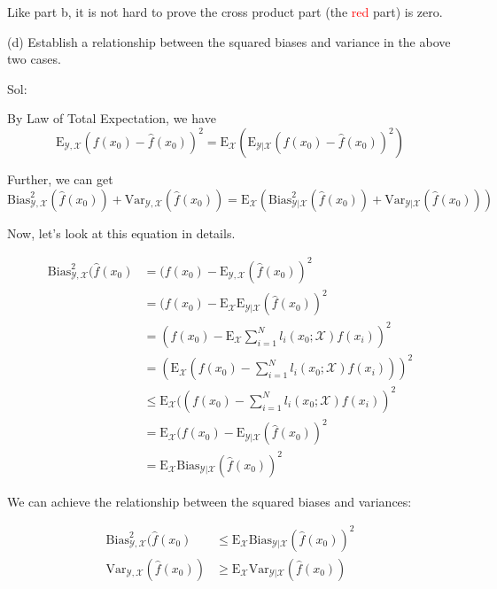 \documentclass[english]{article}\usepackage[]{graphicx}\usepackage[]{color}
\begin{document}
Like part b, it is not hard to prove the cross product part (the \textcolor{red}{red}
part) is zero.

\vspace{0.5cm}

(d) Establish a relationship between the squared biases and variance
in the above two cases.

\vspace{0.5cm}

Sol:

By Law of Total Expectation, we have 
\[
\mathrm{E}_{\mathcal{Y},\mathcal{X}}(f(x_{0})-\hat{f}(x_{0}))^{2}=\mathrm{E}_{\mathcal{X}}(\mathrm{E}_{\mathcal{Y}|\mathcal{X}}(f(x_{0})-\hat{f}(x_{0}))^{2})
\]

Further, we can get 
\[
\mathrm{Bias}_{\mathcal{Y},\mathcal{X}}^{2}(\hat{f}(x_{0}))+\mathrm{Var}_{\mathcal{Y},\mathcal{X}}(\hat{f}(x_{0}))=\mathrm{E}_{\mathcal{X}}(\mathrm{Bias}_{\mathcal{Y}|\mathcal{X}}^{2}(\hat{f}(x_{0}))+\mathrm{Var}_{\mathcal{Y}|\mathcal{X}}(\hat{f}(x_{0})))
\]

Now, let's look at this equation in details.

\begin{align*}
\mathrm{Bias}_{\mathcal{Y},\mathcal{X}}^{2}(\hat{f}(x_{0}) & =(f(x_{0})-\mathrm{E}_{\mathcal{Y},\mathcal{X}}(\hat{f}(x_{0}))^{2}\\
 & =(f(x_{0})-\mathrm{E_{\mathcal{X}}}\mathrm{E}_{\mathcal{Y}|\mathcal{X}}(\hat{f}(x_{0}))^{2}\\
 & =(f(x_{0})-\mathrm{E}_{\mathcal{X}}\sum_{i=1}^{N}l_{i}(x_{0};\mathcal{X})f(x_{i}))^{2}\\
 & =(\mathrm{E}_{\mathcal{X}}(f(x_{0})-\sum_{i=1}^{N}l_{i}(x_{0};\mathcal{X})f(x_{i})))^{2}\\
 & \leq\mathrm{E}_{\mathcal{X}}((f(x_{0})-\sum_{i=1}^{N}l_{i}(x_{0};\mathcal{X})f(x_{i}))^{2}\\
 & =\mathrm{E}_{\mathcal{X}}(f(x_{0})-\mathrm{E}_{\mathcal{Y}|\mathcal{X}}(\hat{f}(x_{0}))^{2}\\
 & =\mathrm{E}_{\mathcal{X}}\mathrm{Bias}_{\mathcal{Y}|\mathcal{X}}(\hat{f}(x_{0}))^{2}
\end{align*}

We can achieve the relationship between the squared biases and variances:

\begin{align*}
\mathrm{Bias}_{\mathcal{Y},\mathcal{X}}^{2}(\hat{f}(x_{0}) & \leq\mathrm{E}_{\mathcal{X}}\mathrm{Bias}_{\mathcal{Y}|\mathcal{X}}(\hat{f}(x_{0}))^{2}\\
\mathrm{Var}_{\mathcal{Y},\mathcal{X}}(\hat{f}(x_{0})) & \geq\mathrm{E}_{\mathcal{X}}\mathrm{Var}_{\mathcal{Y}|\mathcal{X}}(\hat{f}(x_{0}))
\end{align*}
\end{document}
